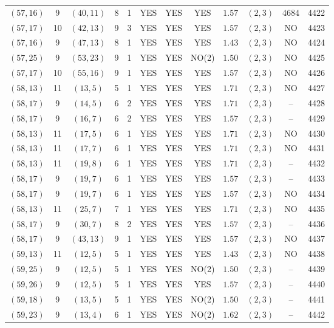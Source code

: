 \begin{longtable}{|c|c|c|c|c|c|c|c|c|c|c|c|}
$(57,16)$ & 9 & $(40,11)$ & 8 & 1 & YES & YES & YES & $1.57$ & $(2,3)$ & 4684 & 4422\\
$(57,17)$ & 10 & $(42,13)$ & 9 & 3 & YES & YES & YES & $1.57$ & $(2,3)$ & NO & 4423\\
$(57,16)$ & 9 & $(47,13)$ & 8 & 1 & YES & YES & YES & $1.43$ & $(2,3)$ & NO & 4424\\
$(57,25)$ & 9 & $(53,23)$ & 9 & 1 & YES & YES & NO(2) & $1.50$ & $(2,3)$ & NO & 4425\\
$(57,17)$ & 10 & $(55,16)$ & 9 & 1 & YES & YES & YES & $1.57$ & $(2,3)$ & NO & 4426\\
$(58,13)$ & 11 & $(13,5)$ & 5 & 1 & YES & YES & YES & $1.71$ & $(2,3)$ & NO & 4427\\
$(58,17)$ & 9 & $(14,5)$ & 6 & 2 & YES & YES & YES & $1.71$ & $(2,3)$ & -- & 4428\\
$(58,17)$ & 9 & $(16,7)$ & 6 & 2 & YES & YES & YES & $1.57$ & $(2,3)$ & -- & 4429\\
$(58,13)$ & 11 & $(17,5)$ & 6 & 1 & YES & YES & YES & $1.71$ & $(2,3)$ & NO & 4430\\
$(58,13)$ & 11 & $(17,7)$ & 6 & 1 & YES & YES & YES & $1.71$ & $(2,3)$ & NO & 4431\\
$(58,13)$ & 11 & $(19,8)$ & 6 & 1 & YES & YES & YES & $1.71$ & $(2,3)$ & -- & 4432\\
$(58,17)$ & 9 & $(19,7)$ & 6 & 1 & YES & YES & YES & $1.57$ & $(2,3)$ & -- & 4433\\
$(58,17)$ & 9 & $(19,7)$ & 6 & 1 & YES & YES & YES & $1.57$ & $(2,3)$ & NO & 4434\\
$(58,13)$ & 11 & $(25,7)$ & 7 & 1 & YES & YES & YES & $1.71$ & $(2,3)$ & NO & 4435\\
$(58,17)$ & 9 & $(30,7)$ & 8 & 2 & YES & YES & YES & $1.57$ & $(2,3)$ & -- & 4436\\
$(58,17)$ & 9 & $(43,13)$ & 9 & 1 & YES & YES & YES & $1.57$ & $(2,3)$ & NO & 4437\\
$(59,13)$ & 11 & $(12,5)$ & 5 & 1 & YES & YES & YES & $1.43$ & $(2,3)$ & NO & 4438\\
$(59,25)$ & 9 & $(12,5)$ & 5 & 1 & YES & YES & NO(2) & $1.50$ & $(2,3)$ & -- & 4439\\
$(59,26)$ & 9 & $(12,5)$ & 5 & 1 & YES & YES & YES & $1.57$ & $(2,3)$ & -- & 4440\\
$(59,18)$ & 9 & $(13,5)$ & 5 & 1 & YES & YES & NO(2) & $1.50$ & $(2,3)$ & -- & 4441\\
$(59,23)$ & 9 & $(13,4)$ & 6 & 1 & YES & YES & NO(2) & $1.62$ & $(2,3)$ & -- & 4442\\

\end{longtable}
